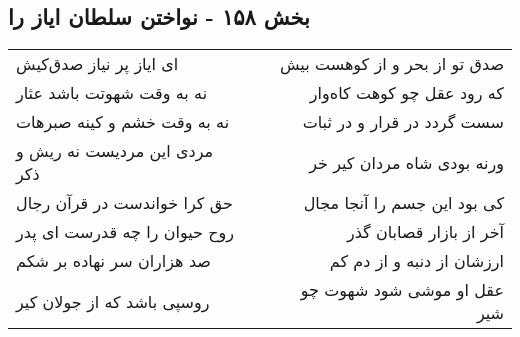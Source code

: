 \begin{center}
\section*{بخش ۱۵۸ - نواختن سلطان ایاز را}
\label{sec:sh158}
\begin{longtable}{l p{0.5cm} r}
ای ایاز پر نیاز صدق‌کیش
&&
صدق تو از بحر و از کوهست بیش
\\
نه به وقت شهوتت باشد عثار
&&
که رود عقل چو کوهت کاه‌وار
\\
نه به وقت خشم و کینه صبرهات
&&
سست گردد در قرار و در ثبات
\\
مردی این مردیست نه ریش و ذکر
&&
ورنه بودی شاه مردان کیر خر
\\
حق کرا خواندست در قرآن رجال
&&
کی بود این جسم را آنجا مجال
\\
روح حیوان را چه قدرست ای پدر
&&
آخر از بازار قصابان گذر
\\
صد هزاران سر نهاده بر شکم
&&
ارزشان از دنبه و از دم کم
\\
روسپی باشد که از جولان کیر
&&
عقل او موشی شود شهوت چو شیر
\\
\end{longtable}
\end{center}
